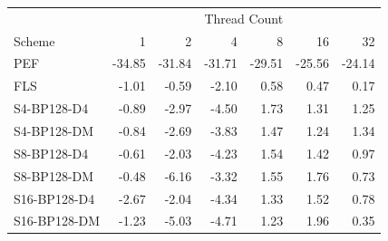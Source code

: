 \begin{tabular}{lrrrrrr}
\toprule
 & \multicolumn{6}{c}{Thread Count} \\
Scheme & 1 & 2 & 4 & 8 & 16 & 32 \\
\midrule
PEF & -34.85 & -31.84 & -31.71 & -29.51 & -25.56 & -24.14 \\
FLS & -1.01 & -0.59 & -2.10 & 0.58 & 0.47 & 0.17 \\
S4-BP128-D4 & -0.89 & -2.97 & -4.50 & 1.73 & 1.31 & 1.25 \\
S4-BP128-DM & -0.84 & -2.69 & -3.83 & 1.47 & 1.24 & 1.34 \\
S8-BP128-D4 & -0.61 & -2.03 & -4.23 & 1.54 & 1.42 & 0.97 \\
S8-BP128-DM & -0.48 & -6.16 & -3.32 & 1.55 & 1.76 & 0.73 \\
S16-BP128-D4 & -2.67 & -2.04 & -4.34 & 1.33 & 1.52 & 0.78 \\
S16-BP128-DM & -1.23 & -5.03 & -4.71 & 1.23 & 1.96 & 0.35 \\
\bottomrule
\end{tabular}
